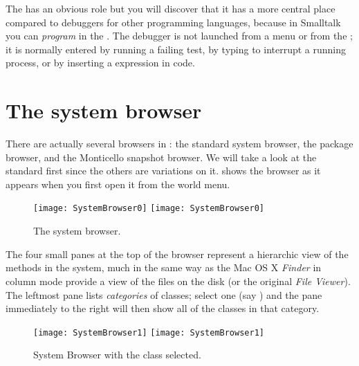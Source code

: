 \documentclass[a4paper,10pt,twoside]{book}
\begin{document}
The  has an obvious role but you will discover that it has a more central place compared to debuggers for other programming languages, because in Smalltalk you can \emph{program} in the .
The debugger is not launched from a menu or from the \toolsflap; it is normally entered by running a failing test, by typing  to interrupt a running process, or by inserting a  expression in code.


\section{The system browser}
\label{sec:browser} %

There are actually several browsers in \sq: the standard system browser, the package browser, and the Monticello snapshot browser.
We will take a look at the standard  first since the others are variations on it.
 shows the browser as it appears when you first open it from the world menu.

\begin{figure}[htbp]
   \centering
   \ifluluelse
	 {\texttt{[image: SystemBrowser0]} }
	 {\texttt{[image: SystemBrowser0]} }
   \caption{The system browser.}
   \label{fig:SystemBrowser0}
\end{figure}

The four small panes at the top of the browser represent a hierarchic view of the methods in the system, much in the same way as the Mac OS X \textit{Finder} in column mode provide a view of the files on the disk (or the original  \textit{File Viewer}).
The leftmost pane lists \emph{categories} of classes; select one (say ) and the pane immediately to the right will then show all of the classes in that category.

\begin{figure}[htbp]
   \centering
   \ifluluelse
	   {\texttt{[image: SystemBrowser1]} }
	   {\texttt{[image: SystemBrowser1]} }
   \caption{System Browser with the class  selected.
   \label{fig:SystemBrowserModel}}
\end{figure}
\end{document}

